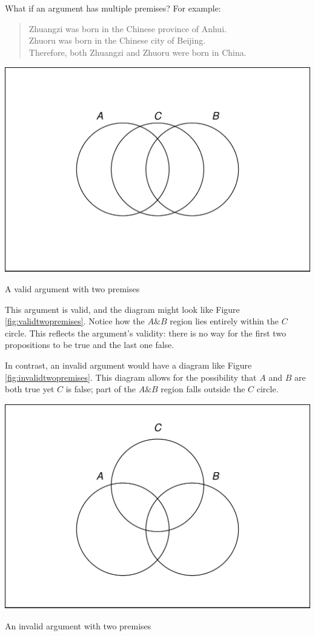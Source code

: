 \documentclass[justified]{tufte-book}
\renewcommand{\wedge}{\mathbin{\&}}
\newenvironment{argument}{\begin{quote}\normalsize}{\end{quote}}
\theoremstyle{definition}
\theoremstyle{definition}
\theoremstyle{definition}
\theoremstyle{remark}
\begin{document}
What if an argument has multiple premises? For example:
\begin{argument}
Zhuangzi was born in the Chinese province of Anhui.\\
Zhuoru was born in the Chinese city of Beijing.\\
Therefore, both Zhuangzi and Zhuoru were born in China.
\end{argument}
\begin{marginfigure}
\includegraphics{_main_files/figure-latex/validtwopremises-1} \caption[A valid argument with two premises]{A valid argument with two premises}\label{fig:validtwopremises}
\end{marginfigure}
This argument is valid, and the diagram might look like Figure \ref{fig:validtwopremises}. Notice how the \(A \wedge B\) region lies entirely within the \(C\) circle. This reflects the argument's validity: there is no way for the first two propositions to be true and the last one false.

In contrast, an invalid argument would have a diagram like Figure \ref{fig:invalidtwopremises}. This diagram allows for the possibility that \(A\) and \(B\) are both true yet \(C\) is false; part of the \(A \wedge B\) region falls outside the \(C\) circle.

\begin{marginfigure}
\includegraphics{_main_files/figure-latex/invalidtwopremises-1} \caption[An invalid argument with two premises]{An invalid argument with two premises}\label{fig:invalidtwopremises}
\end{marginfigure}
\end{document}
